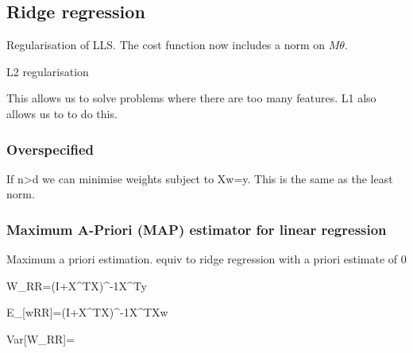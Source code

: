 
\subsection{Ridge regression}

Regularisation of LLS. The cost function now includes a norm on \(M\theta \).

L2 regularisation

This allows us to solve problems where there are too many features. L1 also allows us to to do this.

\subsubsection{Overspecified}

If n>d we can minimise weights subject to Xw=y. This is the same as the least norm.

\subsubsection{Maximum A-Priori (MAP) estimator for linear regression}

Maximum a priori estimation. equiv to ridge regression with a priori estimate of 0

W_{RR}=(\lamda I+X^TX)^{-1}X^Ty

E_[w{RR}]=(\lambda I+X^TX)^{-1}X^TXw

Var[W_{RR}]=\a


